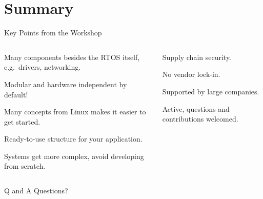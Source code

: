\documentclass[10pt, aspectratio=169]{beamer}
\begin{document}
\section{Summary}
\begin{frame}[fragile]{Key Points from the Workshop\footnotemark}
  \begin{columns}
    \begin{column}{0.6\textwidth}
      \begin{description}
        \item [Ecosystem] Many components besides the RTOS itself, e.g.~drivers, networking.
        \item Modular and hardware independent by default!
        \item Many concepts from Linux makes it easier to get started.
        \item [Structure] Ready-to-use structure for your application.
        \item Systems get more complex, avoid developing from scratch.
      \end{description}
    \end{column}
    \begin{column}{0.4\textwidth}
      \begin{description}
        \item [Open Source] Supply chain security.
        \item No vendor lock-in.
        \item Supported by large companies.
        \item [Community] Active, questions and contributions welcomed.
      \end{description}
    \end{column}
  \end{columns}
\end{frame}
\begin{frame}{Q and A}
  \centering
  \LARGE Questions?

\end{frame}
\appendix
\end{document}
